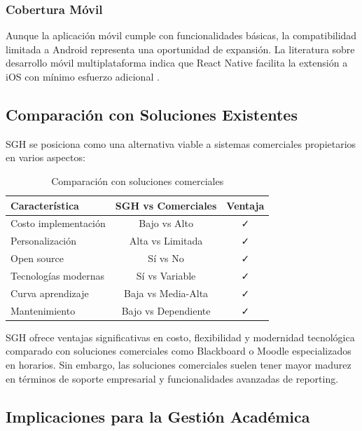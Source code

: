 \subsubsection{Cobertura Móvil}

Aunque la aplicación móvil cumple con funcionalidades básicas, la compatibilidad limitada a Android representa una oportunidad de expansión. La literatura sobre desarrollo móvil multiplataforma indica que React Native facilita la extensión a iOS con mínimo esfuerzo adicional \cite{macias2021}.

\subsection{Comparación con Soluciones Existentes}

SGH se posiciona como una alternativa viable a sistemas comerciales propietarios en varios aspectos:

\begin{table}[h]
\centering
\caption{Comparación con soluciones comerciales}
\label{tab:comparacion_soluciones}
\begin{tabular}{|l|c|c|}
\hline
\textbf{Característica} & \textbf{SGH vs Comerciales} & \textbf{Ventaja} \\
\hline
Costo implementación & Bajo vs Alto & ✓ \\
\hline
Personalización & Alta vs Limitada & ✓ \\
\hline
Open source & Sí vs No & ✓ \\
\hline
Tecnologías modernas & Sí vs Variable & ✓ \\
\hline
Curva aprendizaje & Baja vs Media-Alta & ✓ \\
\hline
Mantenimiento & Bajo vs Dependiente & ✓ \\
\hline
\end{tabular}
\end{table}

SGH ofrece ventajas significativas en costo, flexibilidad y modernidad tecnológica comparado con soluciones comerciales como Blackboard o Moodle especializados en horarios. Sin embargo, las soluciones comerciales suelen tener mayor madurez en términos de soporte empresarial y funcionalidades avanzadas de reporting.

\subsection{Implicaciones para la Gestión Académica}

